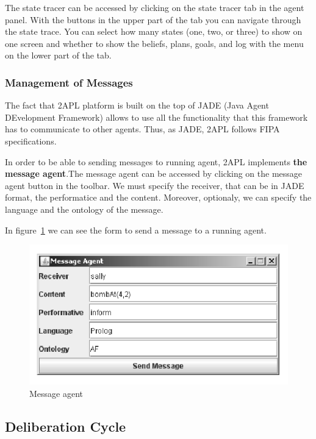\documentclass[a4paper]{article}
\begin{document}
The state tracer can be accessed by clicking on the state tracer tab in the agent panel. With the buttons in the upper part of the tab you can navigate through the state trace. You can select how many states (one, two, or three) to show on one screen and whether to show the beliefs, plans, goals, and log with the menu on the lower part of the tab.

\subsubsection{Management of Messages}

The fact that 2APL platform is built on the top of JADE (Java Agent DEvelopment Framework) allows to use all the functionality that this framework has to communicate to other agents. Thus, as JADE, 2APL follows FIPA specifications.

In order to be able to sending messages to running agent, 2APL implements {\bf the message agent}.The message agent can be accessed by clicking on the message agent button in the toolbar. We must specify the receiver, that can be in JADE format, the performatice and the content. Moreover, optionaly, we can specify the language and the ontology of the message.

In figure~\ref{fig:message_agent} we can see the form to send a message to a running agent.

\begin{figure}[htp]
\centering
\includegraphics[keepaspectratio,scale=0.65]{fig/messageagent.png}
\caption{Message agent}
\label{fig:message_agent}
\end{figure}

\subsection{Deliberation Cycle} %
\end{document}

